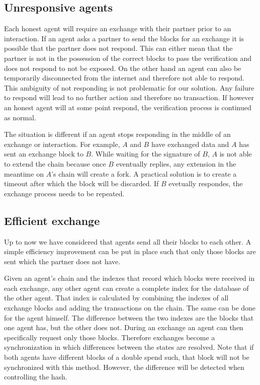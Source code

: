 \subsection{Unresponsive agents}
Each honest agent will require an exchange with their partner prior to an interaction. If an agent 
asks a partner to send the blocks for an exchange it is possible that the partner does not respond.
This can either mean that the partner is not in the possession of the correct blocks to pass the  
verification and does not respond to not be exposed. On the other hand an agent can also be 
temporarily disconnected from the internet and therefore not able to respond. This ambiguity of not 
responding is not problematic for our solution. Any failure to respond will
lead to no further action and therefore no transaction. If however an honest agent will at some 
point respond, the verification process is continued as normal.

The situation is different if an agent stops responding in the middle of an exchange or interaction.
For example, $A$ and $B$ have exchanged data and $A$ has sent an exchange block to $B$. While waiting
for the signature of $B$, $A$ is not able to extend the chain because once $B$ eventually replies,
any extension in the meantime on $A$'s chain will create a fork. A practical solution is to create 
a timeout after which the block will be discarded. If $B$ evetually respondes, the exchange process 
needs to be repeated. 

\subsection{Efficient exchange}
Up to now we have considered that agents send all their blocks to each other. A simple efficiency 
improvement can be put in place such that only those blocks are sent which the partner does not have.

Given an agent's chain and the indexes that record which blocks were received in each exchange, any
other agent can create a complete index for the database of the other agent. That index is calculated
by combining the indexes of all exchange blocks and adding the transactions on the chain. The same
can be done for the agent himself. The difference between the two indexes are the blocks that one
agent has, but the other does not. During an exchange an agent can then specifically request only
those blocks. Therefore exchanges become a synchronization in which differences between the states
are resolved. Note that if both agents have different blocks of a double spend such, that block will
not be synchronized with this method. However, the difference will be detected when controlling the
hash.

